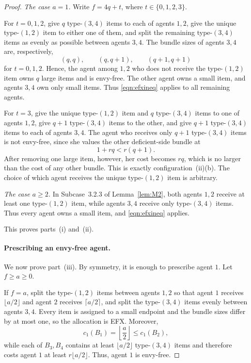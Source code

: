 \documentclass{article}
\theoremstyle{definition}
\begin{document}
\begin{proof}
\smallskip
\noindent\emph{The case $a=1$.}
Write $f=4q+t$, where $t\in\{0,1,2,3\}$.

For $t=0,1,2$, give $q$ type-$(3,4)$ items to each of agents $1,2$, give
the unique type-$(1,2)$ item to either one of them, and split the remaining
type-$(3,4)$ items as evenly as possible between agents $3,4$.  The bundle
sizes of agents $3,4$ are, respectively,
\[
 (q,q),\qquad(q,q+1),\qquad(q+1,q+1)
\]
for $t=0,1,2$.  Hence, the agent among $1,2$ who does not receive the
type-$(1,2)$ item owns $q$ large items and is envy-free.  The other
agent owns a small item, and agents $3,4$ own only small items.  Thus \eqref{eqn:efxineq}
applies to all remaining agents.

For $t=3$, give the unique type-$(1,2)$ item and $q$ type-$(3,4)$ items
to one of agents $1,2$, give $q+1$ type-$(3,4)$ items to the other, and
give $q+1$ type-$(3,4)$ items to each of agents $3,4$.  The agent who
receives only $q+1$ type-$(3,4)$ items is not envy-free, since she
values the other deficient-side bundle at
\[
 1+rq<r(q+1).
\]
After removing one large item, however, her cost becomes $rq$, which is no
larger than the cost of any other bundle.  This is exactly
configuration~(ii)(b).  The choice of which agent receives the unique
type-$(1,2)$ item is arbitrary.

\smallskip
\noindent\emph{The case $a\ge2$.}
In Subcase~3.2.3 of Lemma~\ref{lem:M2}, both agents $1,2$ receive at least one
type-$(1,2)$ item, while agents $3,4$ receive only type-$(3,4)$ items.
Thus every agent owns a small item, and \eqref{eqn:efxineq} applies.

This proves parts~(i) and~(ii).

\paragraph{Prescribing an envy-free agent.}
We now prove part~(iii).  By symmetry, it is enough to prescribe agent $1$.
Let $f\ge a\geq0$.

If $f=a$, split the type-$(1,2)$ items between agents $1,2$ so that agent
$1$ receives $\lfloor a/2\rfloor$ and agent $2$ receives
$\lceil a/2\rceil$, and split the type-$(3,4)$ items evenly between agents
$3,4$.  Every item is assigned to a small endpoint and the bundle sizes
differ by at most one, so the allocation is EFX.  Moreover,
\[
 c_1(B_1)=\left\lfloor\frac a2\right\rfloor
 \le c_1(B_2),
\]
while each of $B_3,B_4$ contains at least $\lfloor a/2\rfloor$
type-$(3,4)$ items and therefore costs agent $1$ at least
$r\lfloor a/2\rfloor$.  Thus, agent $1$ is envy-free.


\end{proof}
\end{document}
